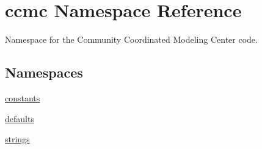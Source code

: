 \hypertarget{namespaceccmc}{\section{ccmc Namespace Reference}
\label{namespaceccmc}
}


Namespace for the Community Coordinated Modeling Center code.  


\subsection*{Namespaces}
\begin{DoxyCompactItemize}
\item 
\hyperlink{namespaceccmc_1_1constants}{constants}
\item 
\hyperlink{namespaceccmc_1_1defaults}{defaults}
\item 
\hyperlink{namespaceccmc_1_1strings}{strings}
\end{DoxyCompactItemize}

